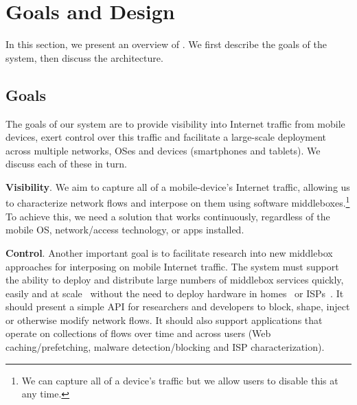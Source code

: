 \section{Goals and Design}
\label{sec:goals}

In this section, we present an overview of \meddle. We first describe the goals of the 
system, then discuss the \meddle architecture. 


\subsection{Goals}

The goals of our system are to provide visibility into Internet traffic from mobile devices, 
exert control over this traffic and facilitate a large-scale deployment across multiple 
networks, OSes and devices (smartphones and tablets). We discuss each of these in turn.

\noindent\textbf{Visibility}. We aim to capture all of a mobile-device's Internet traffic,
allowing us to characterize network flows and interpose on them using software middleboxes.\footnote{We can capture all of a device's traffic but we allow users to disable this at any time.}  To achieve this, we need a solution that works continuously, regardless of the mobile OS, network/access 
technology, or apps installed. %
  
\noindent\textbf{Control}. Another important goal is to facilitate research into new middlebox approaches 
for interposing on mobile Internet traffic. The system must support the ability to deploy and distribute large numbers 
of middlebox services quickly, easily and at scale~\cite{sherry:middleboxes} without 
the need to deploy hardware in homes~\cite{bismark} or ISPs~\cite{wang:middleboxes}. 
It should present a simple API for researchers and developers to block, shape, inject or otherwise 
modify network flows. It should also support applications that operate on collections of flows over 
time and across users (\eg Web caching/prefetching, malware detection/blocking and ISP characterization). 

